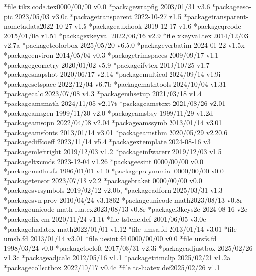 {  *{file}   {tikz.code.tex}{0000/00/00 v0.0}
  *{package}{wrapfig}     {2003/01/31 v3.6}
  *{package}{eso-pic}     {2023/05/03 v3.0c}
  *{package}{transparent} {2022-10-27 v1.5}
  *{package}{transparent-nometadata}{2022-10-27 v1.5}
  *{package}{auxhook}     {2019-12-17 v1.6}
  *{package}{qrcode}      {2015/01/08 v1.51}
  *{package}{xkeyval}     {2022/06/16 v2.9}
  *{file}   {xkeyval.tex} {2014/12/03 v2.7a}
  *{package}{tcolorbox}   {2025/05/20 v6.5.0}
  *{package}{verbatim}    {2024-01-22 v1.5x}
  *{package}{environ}     {2014/05/04 v0.3}
  *{package}{trimspaces}  {2009/09/17 v1.1}
  *{package}{geometry}    {2020/01/02 v5.9}
  *{package}{ifvtex}      {2019/10/25 v1.7}
  *{package}{snapshot}    {2020/06/17 v2.14}
  *{package}{multicol}    {2024/09/14 v1.9i}
  *{package}{setspace}    {2022/12/04 v6.7b}
  *{package}{mathtools}   {2024/10/04 v1.31}
  *{package}{calc}        {2023/07/08 v4.3}
  *{package}{mhsetup}     {2021/03/18 v1.4}
  *{package}{amsmath}     {2024/11/05 v2.17t}
  *{package}{amstext}     {2021/08/26 v2.01}
  *{package}{amsgen}      {1999/11/30 v2.0}
  *{package}{amsbsy}      {1999/11/29 v1.2d}
  *{package}{amsopn}      {2022/04/08 v2.04}
  *{package}{amssymb}     {2013/01/14 v3.01}
  *{package}{amsfonts}    {2013/01/14 v3.01}
  *{package}{amsthm}      {2020/05/29 v2.20.6}
  *{package}{diffcoeff}   {2023/11/14 v5.4}
  *{package}{xtemplate}   {2024-08-16 v3}
  *{package}{mleftright}  {2019/12/03 v1.2}
  *{package}{infwarerr}   {2019/12/03 v1.5}
  *{package}{ltxcmds}     {2023-12-04 v1.26}
  *{package}{esint}       {0000/00/00 v0.0}
  *{package}{mathrsfs}    {1996/01/01 v1.0}
  *{package}{polynomial}  {0000/00/00 v0.0}
  *{package}{tensor}      {2023/07/18 v2.2}
  *{package}{braket}      {0000/00/00 v0.0}
  *{package}{svrsymbols}  {2019/02/12 v2.0b,}
  *{package}{adforn}      {2025/03/31 v1.3}
  *{package}{svn-prov}    {2010/04/24 v3.1862}
  *{package}{unicode-math}{2023/08/13 v0.8r}
  *{package}{unicode-math-luatex}{2023/08/13 v0.8r}
  *{package}{l3keys2e}    {2024-08-16 v2e}
  *{package}{fix-cm}      {2020/11/24 v1.1t}
  *{file}   {ts1enc.def}  {2001/06/05 v3.0e}
  *{package}{lualatex-math}{2022/01/01 v1.12}
  *{file}   {umsa.fd}     {2013/01/14 v3.01}
  *{file}   {umsb.fd}     {2013/01/14 v3.01}
  *{file}   {uesint.fd}   {0000/00/00 v0.0}
  *{file}   {ursfs.fd}    {1998/03/24 v0.0}
  *{package}{tocloft}     {2017/08/31 v2.3i}
  *{package}{adjustbox}   {2025/02/26 v1.3c}
  *{package}{adjcalc}     {2012/05/16 v1.1}
  *{package}{trimclip}    {2025/02/21 v1.2a}
  *{package}{collectbox}  {2022/10/17 v0.4c}
  *{file}   {tc-luatex.def}{2025/02/26 v1.1}
}
